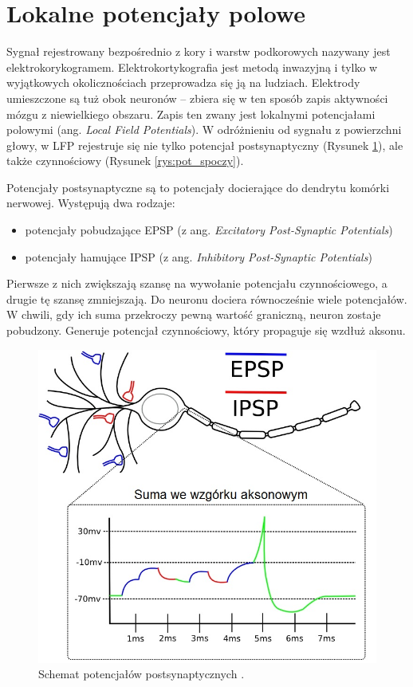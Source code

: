 \documentclass{pracamgr_2}
\begin{document}
	\section{Lokalne potencjały polowe}
	Sygnał rejestrowany bezpośrednio z kory i warstw podkorowych nazywany jest elektrokorykogramem. Elektrokortykografia jest metodą inwazyjną i tylko w  wyjątkowych okolicznościach przeprowadza się ją na ludziach. Elektrody umieszczone są tuż obok neuronów -- zbiera się w ten sposób zapis aktywności mózgu z niewielkiego obszaru. Zapis ten zwany jest lokalnymi potencjałami polowymi (ang. \textit{Local Field Potentials}). W odróżnieniu od sygnału z powierzchni głowy, w LFP rejestruje się nie tylko potencjał postsynaptyczny (Rysunek \ref{rys:epsp}), ale także czynnościowy (Rysunek \ref{rys:pot_spoczy}).
	
	Potencjały postsynaptyczne są to potencjały docierające do dendrytu komórki nerwowej. Występują dwa rodzaje:
	\begin{itemize}
		\item potencjały pobudzające EPSP (z ang. \textit{Excitatory Post-Synaptic Potentials})
		\item potencjały hamujące IPSP (z ang. \textit{Inhibitory Post-Synaptic Potentials}) 
	\end{itemize}
	Pierwsze z nich zwiększają szansę na wywołanie potencjału czynnościowego, a drugie tę szansę zmniejszają. Do neuronu dociera równocześnie wiele potencjałów. W chwili, gdy ich suma przekroczy pewną wartość graniczną, neuron zostaje pobudzony. Generuje potencjał czynnościowy, który propaguje się wzdłuż aksonu.
	\begin{figure}[htbp]
		\begin{center}
			\includegraphics[scale=0.5]{epsp.jpg}
		\end{center}
		\caption{Schemat potencjałów postsynaptycznych \citep{versace}.}
		\label{rys:epsp}
	\end{figure}
\end{document}

